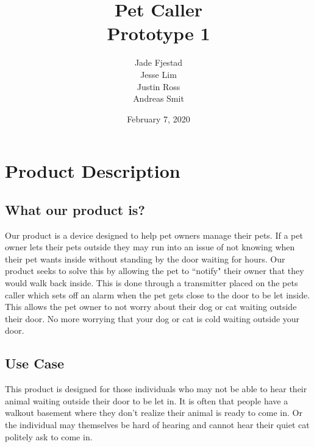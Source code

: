 \documentclass[titlepage]{article}
\title{Pet Caller\\ Prototype 1}
\author
{
    Jade Fjestad\\
    Jesse Lim\\
    Justin Ross\\
    Andreas Smit
}
\date{February 7, 2020}
\begin{document}
    \maketitle

    \section{Product Description}
    \subsection{What our product is?}
    Our product is a device designed to help pet owners manage their
    pets. If a pet owner lets their pets outside they may run into an
    issue of not knowing when their pet wants inside without standing by
    the door waiting for hours. Our product seeks to solve this by
    allowing the pet to ``notify" their owner that they would walk back
    inside. This is done through a transmitter placed on the pets caller
    which sets off an alarm when the pet gets close to the door to be
    let inside. This allows the pet owner to not worry about their
    dog or cat waiting outside their door. No more worrying that your
    dog or cat is cold waiting outside your door.

    \subsection{Use Case}
    This product is designed for those individuals who may not be able
    to hear their animal waiting outside their door to be let in. It is
    often that people have a walkout basement where they don’t realize
    their animal is ready to come in. Or the individual may themselves
    be hard of hearing and cannot hear their quiet cat politely ask to
    come in.
\end{document}
